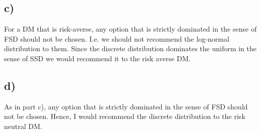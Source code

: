 \documentclass{article}
\begin{document}
\subsection{c)}
	For a DM that is risk-averse, any option that is strictly dominated in the sense of FSD should not be chosen. I.e. we should not recommend the log-normal distribution to them. 
	Since the discrete distribution dominates the uniform in the sense of SSD we would recommend it to the risk averse DM.
\subsection{d)}
	As in part c), any option that is strictly dominated in the sense of FSD should not be chosen. Hence, I would recommend the discrete distribution to the risk neutral DM.
	
\end{document}
